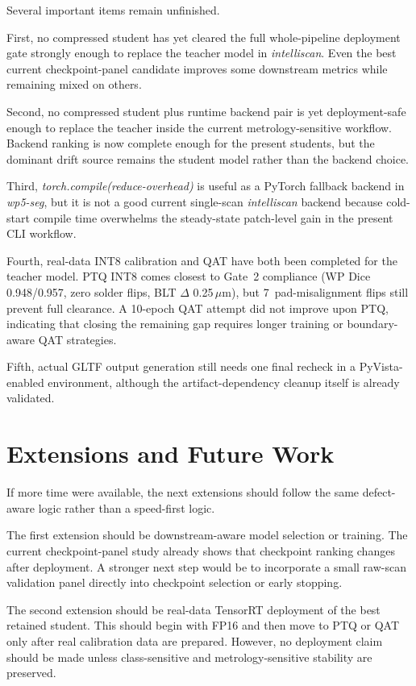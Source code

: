 Several important items remain unfinished.

First, no compressed student has yet cleared the full whole-pipeline
deployment gate strongly enough to replace the teacher model in
\emph{intelliscan}. Even the best current checkpoint-panel candidate
improves some downstream metrics while remaining mixed on others.

Second, no compressed student plus runtime backend pair is yet
deployment-safe enough to replace the teacher inside the current
metrology-sensitive workflow. Backend ranking is now complete enough for
the present students, but the dominant drift source remains the student
model rather than the backend choice.

Third, \emph{torch.compile(reduce-overhead)} is useful as a PyTorch
fallback backend in \emph{wp5-seg}, but it is not a good current
single-scan \emph{intelliscan} backend because cold-start compile time
overwhelms the steady-state patch-level gain in the present CLI
workflow.

Fourth, real-data INT8 calibration and QAT have both been completed for the teacher model. PTQ INT8 comes closest to Gate~2 compliance (WP Dice 0.948/0.957, zero solder flips, BLT $\Delta$ 0.25\,$\mu$m), but 7~pad-misalignment flips still prevent full clearance. A 10-epoch QAT attempt did not improve upon PTQ, indicating that closing the remaining gap requires longer training or boundary-aware QAT strategies.

Fifth, actual GLTF output generation still needs one final recheck in a
PyVista-enabled environment, although the artifact-dependency cleanup
itself is already validated.

\hypertarget{extensions-and-future-work}{%
\section{Extensions and Future Work}\label{extensions-and-future-work}}

If more time were available, the next extensions should follow the same
defect-aware logic rather than a speed-first logic.

The first extension should be downstream-aware model selection or
training. The current checkpoint-panel study already shows that
checkpoint ranking changes after deployment. A stronger next step would
be to incorporate a small raw-scan validation panel directly into
checkpoint selection or early stopping.

The second extension should be real-data TensorRT deployment of the best
retained student. This should begin with FP16 and then move to PTQ or
QAT only after real calibration data are prepared. However, no
deployment claim should be made unless class-sensitive and
metrology-sensitive stability are preserved.

